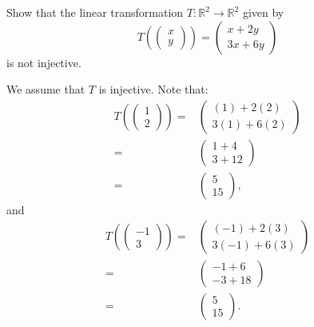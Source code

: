 \documentclass[12pt]{article}
\newenvironment{problem}[2][Problem]
{
	\begin{trivlist} 
		\item[\hskip \labelsep {\bfseries #1 #2:}]
	}
{
	\end{trivlist}
	}
\newenvironment{solution}[1][Solution]
{
	\begin{trivlist} 
		\item[\hskip \labelsep {\itshape #1:}]
	}
	{
	\end{trivlist}
}
\begin{document}
\newpage
\begin{problem}{3}
Show that the linear transformation $T:\mathbb{R} ^2 \to \mathbb{R} ^2$ given by
\[
T\left(\begin{pmatrix} x \\ y\end{pmatrix} \right)=\begin{pmatrix} x+2y \\ 3x+6y\end{pmatrix}
\]
is not injective.
\begin{solution}
We assume that $T$ is injective. Note that:
\begin{align*}
T\left(\begin{pmatrix} 1 \\ 2\end{pmatrix} \right)=&\begin{pmatrix} (1)+2(2) \\ 3(1)+6(2)\end{pmatrix}\\
=&\begin{pmatrix} 1+4 \\ 3+12\end{pmatrix}\\
=&\begin{pmatrix} 5 \\ 15\end{pmatrix} \text{,}
\end{align*}
and
\begin{align*}
T\left(\begin{pmatrix} -1 \\ 3\end{pmatrix} \right)=&\begin{pmatrix} (-1)+2(3) \\ 3(-1)+6(3)\end{pmatrix}\\
=&\begin{pmatrix} -1+6 \\ -3+18\end{pmatrix}\\
=&\begin{pmatrix} 5 \\ 15\end{pmatrix}\text{.}
\end{align*}

\end{solution}
\end{problem}
\end{document}
